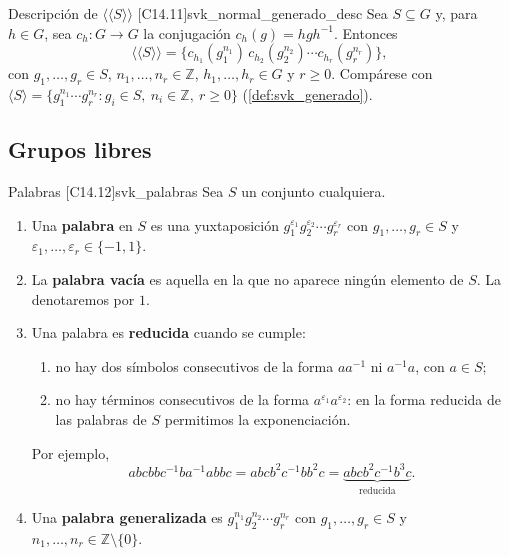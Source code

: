 \begin{teorema}{Descripción de $\langle\langle S \rangle\rangle$ [C14.11]}{svk_normal_generado_desc}
Sea $S \subseteq G$ y, para $h \in G$, sea $c_h \colon G \to G$ la conjugación $c_h(g) = h g h^{-1}$. Entonces
\[ \langle\langle S \rangle\rangle = \big\{ c_{h_1}(g_1^{n_1})\, c_{h_2}(g_2^{n_2}) \cdots c_{h_r}(g_r^{n_r}) \big\}, \]
con $g_1, \dots, g_r \in S$, $n_1, \dots, n_r \in \mathbb{Z}$, $h_1, \dots, h_r \in G$ y $r \geq 0$.
Compárese con $\langle S \rangle = \{ g_1^{n_1} \cdots g_r^{n_r} : g_i \in S,\ n_i \in \mathbb{Z},\ r \geq 0 \}$ (\cref{def:svk_generado}).
\end{teorema}

\subsection{Grupos libres}

\begin{definicion}{Palabras [C14.12]}{svk_palabras}
Sea $S$ un conjunto cualquiera.
\begin{enumerate}
    \item[a)] Una \textbf{palabra} en $S$ es una yuxtaposición $g_1^{\varepsilon_1} g_2^{\varepsilon_2} \cdots g_r^{\varepsilon_r}$ con $g_1, \dots, g_r \in S$ y $\varepsilon_1, \dots, \varepsilon_r \in \{-1, 1\}$.
    \item[b)] La \textbf{palabra vacía} es aquella en la que no aparece ningún elemento de $S$. La denotaremos por $1$.
    \item[c)] Una palabra es \textbf{reducida} cuando se cumple:
    \begin{enumerate}
        \item[1)] no hay dos símbolos consecutivos de la forma $a a^{-1}$ ni $a^{-1} a$, con $a \in S$;
        \item[2)] no hay términos consecutivos de la forma $a^{\varepsilon_1} a^{\varepsilon_2}$: en la forma reducida de las palabras de $S$ permitimos la exponenciación.
    \end{enumerate}
    Por ejemplo,
    \[ abcbbc^{-1}ba^{-1}abbc = abcb^2c^{-1}bb^2c = \underbrace{abcb^2c^{-1}b^3c}_{\text{reducida}}. \]
    \item[d)] Una \textbf{palabra generalizada} es $g_1^{n_1} g_2^{n_2} \cdots g_r^{n_r}$ con $g_1, \dots, g_r \in S$ y $n_1, \dots, n_r \in \mathbb{Z} \setminus \{0\}$.
\end{enumerate}
\end{definicion}

